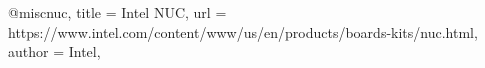 
@misc{nuc,
 title = {Intel NUC},
 url = {https://www.intel.com/content/www/us/en/products/boards-kits/nuc.html},
 author = {Intel},
}